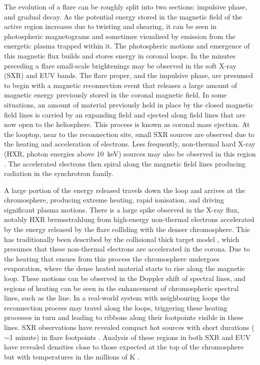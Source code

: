 The evolution of a flare can be roughly split into two sections: impulsive phase, and gradual decay.
As the potential energy stored in the magnetic field of the active region increases due to twisting and shearing, it can be seen in photospheric magnetograms and sometimes visualised by emission from the energetic plasma trapped within it.
The photospheric motions and emergence of this magnetic flux builds and stores energy in coronal loops.
In the minutes preceding a flare small-scale brightenings may be observed in the soft X-ray (SXR) and EUV bands.
The flare proper, and the impulsive phase, are presumed to begin with a magnetic reconnection event that releases a large amount of magnetic energy previously stored in the coronal magnetic field.
In some situations, an amount of material previously held in place by the closed magnetic field lines is carried by an expanding field and ejected along field lines that are now open to the heliosphere.
This process is known as coronal mass ejection.
At the looptop, near to the reconnection site, small SXR sources are observed due to the heating and acceleration of electrons.
Less frequently, non-thermal hard X-ray (HXR, photon energies above \SI{10}{\kilo\electronvolt}) sources may also be observed in this region \citep{Krucker2008}.
The accelerated electrons then spiral along the magnetic field lines producing radiation in the synchrotron family.

A large portion of the energy released travels down the loop and arrives at the chromosphere, producing extreme heating, rapid ionisation, and driving significant plasma motions.
There is a large spike observed in the X-ray flux, notably HXR bremsstrahlung from high-energy non-thermal electrons accelerated by the energy released by the flare colliding with the denser chromosphere.
This has traditionally been described by the collisional thick target model \citep{Brown1971,Hudson1972}, which presumes that these non-thermal electrons are accelerated in the corona.
Due to the heating that ensues from this process the chromosphere undergoes evaporation, where the dense heated material starts to rise along the magnetic loop.
These motions can be observed in the Doppler shift of spectral lines, and regions of heating can be seen in the enhancement of chromospheric spectral lines, such as the \Ha{} line.
In a real-world system with neighbouring loops the reconnection process may travel along the loops, triggering these heating processes in turn and leading to ribbons along their footpoints visible in these lines.
SXR observations have revealed compact hot sources with short durations ($\sim$1 minute) in flare footpoints \citep{Hudson1994}.
Analysis of these regions in both SXR and EUV have revealed densities close to those expected at the top of the chromosphere but with temperatures in the millions of \si{\kelvin} \citep{Mrozek2004,Graham2013,Simoes2015}.

